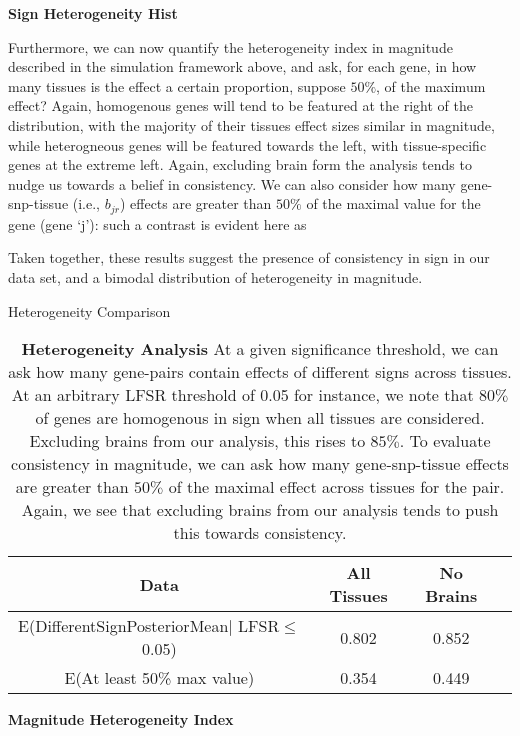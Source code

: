 \textbf{Sign Heterogeneity Hist}

Furthermore, we can now quantify the heterogeneity index in magnitude described in the simulation framework above, and ask, for each gene, in how many tissues is the effect a certain  proportion, suppose $50\%$, of the maximum effect? Again, homogenous genes will tend to be featured at the right of the distribution, with the majority of their tissues effect sizes similar in magnitude, while heterogneous genes will be featured towards the left, with tissue-specific genes at the extreme left. Again, excluding brain form the analysis tends to nudge us towards a belief in consistency. We can also consider how many gene-snp-tissue (i.e., $b_{jr}$) effects are greater than $50\%$ of the maximal value for the gene (gene `j'): such a contrast is evident here as 

Taken together, these results suggest the presence of consistency in sign in our data set, and a bimodal distribution of heterogeneity in magnitude.
\begin{table}[htbp]
\caption{Heterogeneity Comparison}
\centering
\begin{tabular}{c c c c}
\hline\hline
Data & All Tissues  & No Brains  \\ [0.5ex] %
\hline
E(DifferentSignPosteriorMean$\mid$ LFSR$\leq$0.05)&0.802&0.852\\
E(At least 50\% max value) &0.354&0.449\\
\hline
\end{tabular}
\label{table:nonlin}
\caption{\textbf{Heterogeneity Analysis} At a given significance threshold, we can ask how many gene-pairs contain effects of different signs across tissues. At an arbitrary LFSR threshold of 0.05 for instance, we note that $80\%$ of genes are homogenous in sign when all tissues are considered. Excluding brains from our analysis, this rises to $85\%$. To evaluate consistency in magnitude, we can ask how many gene-snp-tissue effects are greater than $50\%$ of the maximal effect across tissues for the pair. Again, we see that excluding brains from our analysis tends to push this towards consistency.}
\end{table}

\textbf{Magnitude Heterogeneity Index}

